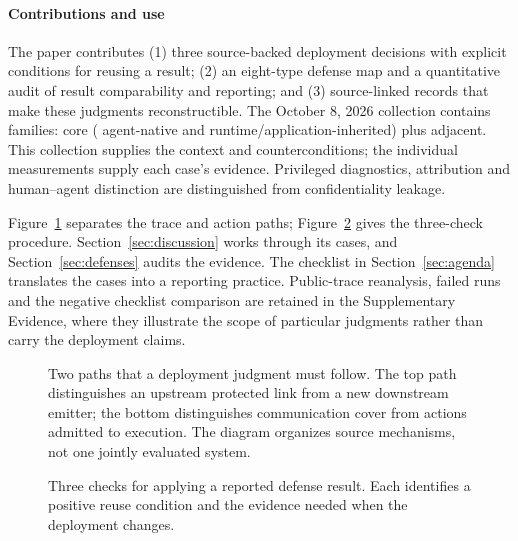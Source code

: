 \paragraph{Contributions and use}
The paper contributes (1) three source-backed deployment decisions with explicit conditions for reusing a result; (2) an eight-type defense map and a quantitative audit of result comparability and reporting; and (3) source-linked records that make these judgments reconstructible. The October 8, 2026 collection contains \FinalN{} families: \FinalCore{} core (\FinalA{} agent-native and \FinalB{} runtime/application-inherited) plus \FinalAdjacent{} adjacent. This collection supplies the context and counterconditions; the individual measurements supply each case's evidence. Privileged diagnostics, attribution and human--agent distinction are distinguished from confidentiality leakage.

Figure~\ref{fig:system-model} separates the trace and action paths; Figure~\ref{fig:defense-decision} gives the three-check procedure. Section~\ref{sec:discussion} works through its cases, and Section~\ref{sec:defenses} audits the evidence. The checklist in Section~\ref{sec:agenda} translates the cases into a reporting practice. Public-trace reanalysis, failed runs and the negative checklist comparison are retained in the Supplementary Evidence, where they illustrate the scope of particular judgments rather than carry the deployment claims.

\begin{figure}[t]
\centering
\caption{Two paths that a deployment judgment must follow. The top path distinguishes an upstream protected link from a new downstream emitter; the bottom distinguishes communication cover from actions admitted to execution. The diagram organizes source mechanisms, not one jointly evaluated system.}
\label{fig:system-model}
\end{figure}

\begin{figure}[t]
\centering
\caption{Three checks for applying a reported defense result. Each identifies a positive reuse condition and the evidence needed when the deployment changes.}
\label{fig:defense-decision}
\end{figure}
